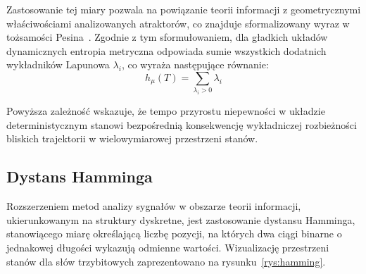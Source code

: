 Zastosowanie tej miary pozwala na powiązanie teorii informacji z geometrycznymi właściwościami analizowanych atraktorów, co znajduje sformalizowany wyraz w tożsamości Pesina~\cite{Pesin1977}. Zgodnie z tym sformułowaniem, dla gładkich układów dynamicznych entropia metryczna odpowiada sumie wszystkich dodatnich wykładników Lapunowa $\lambda_i$, co wyraża następujące równanie:
\begin{equation}
h_\mu(T) = \sum_{\lambda_i > 0} \lambda_i
\label{eq:tozsamosc_pesina}
\end{equation}
 
Powyższa zależność wskazuje, że tempo przyrostu niepewności w układzie deterministycznym stanowi bezpośrednią konsekwencję wykładniczej rozbieżności bliskich trajektorii w wielowymiarowej przestrzeni stanów.
 
\subsection{Dystans Hamminga}
 
Rozszerzeniem metod analizy sygnałów w obszarze teorii informacji, ukierunkowanym na struktury dyskretne, jest zastosowanie dystansu Hamminga, stanowiącego miarę określającą liczbę pozycji, na których dwa ciągi binarne o jednakowej długości wykazują odmienne wartości. Wizualizację przestrzeni stanów dla słów trzybitowych zaprezentowano na rysunku~\ref{rys:hamming}.
 

